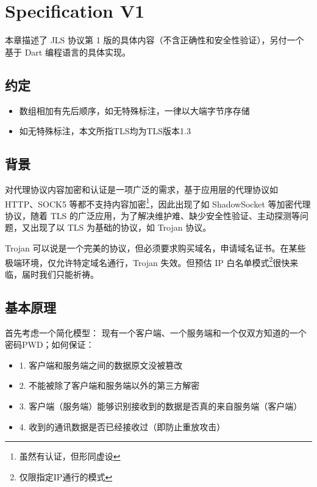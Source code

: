 
\chapter{Specification V1}
本章描述了 JLS 协议第 1 版的具体内容（不含正确性和安全性验证），另付一个基于 Dart 编程语言的具体实现。

\section{约定}
\begin{itemize}
	\item 数组相加有先后顺序，如无特殊标注，一律以大端字节序存储
	\item 如无特殊标注，本文所指TLS均为TLS版本1.3\cite{rescorla2018transport}
\end{itemize}

\section{背景}

对代理协议内容加密和认证是一项广泛的需求，基于应用层的代理协议如 HTTP、SOCK5 等都不支持内容加密\footnote{虽然有认证，但形同虚设}，因此出现了如 ShadowSocket 等加密代理协议，随着 TLS 的广泛应用，为了解决维护难、缺少安全性验证、主动探测等问题，又出现了以 TLS 为基础的协议，如 Trojan 协议。

Trojan 可以说是一个完美的协议，但必须要求购买域名，申请域名证书。在某些极端环境，仅允许特定域名通行，Trojan 失效。但预估 IP 白名单模式\footnote{仅限指定IP通行的模式}很快来临，届时我们只能祈祷。


\section{基本原理}

首先考虑一个简化模型：
现有一个客户端、一个服务端和一个仅双方知道的一个密码PWD；如何保证：\newline
\begin{itemize}
	\item 1. 客户端和服务端之间的数据原文没被篡改
	\item 2. 不能被除了客户端和服务端以外的第三方解密
	\item 3. 客户端（服务端）能够识别接收到的数据是否真的来自服务端（客户端）
	\item 4. 收到的通讯数据是否已经接收过（即防止重放攻击）\newline
\end{itemize}

